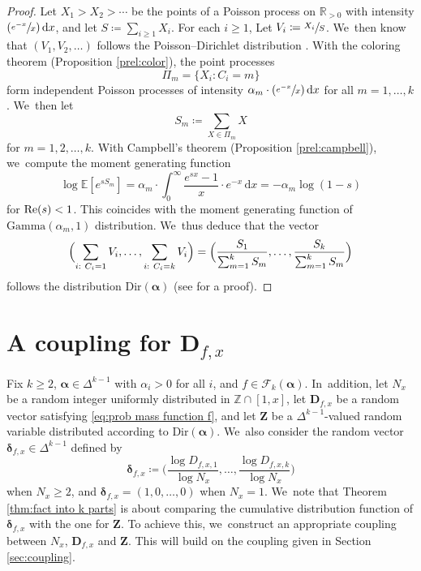 \documentclass[JEP,XML,SOM,Unicode,published]{cedram}
\newcommand{\bD}{{\boldsymbol D}}
\newcommand{\bZ}{{\boldsymbol Z}}
\newcommand{\Psfrac}[2]{(\sfrac{#1}{#2})}
\newcommand{\ZZ}{\mathbb{Z}}
\newcommand{\RR}{\mathbb{R}}
\newcommand{\EE}{\mathbb{E}}
\newcommand{\boldalpha}{\boldsymbol{\alpha}}
\newcommand{\bolddelta}{\boldsymbol{\delta}}
\newcommand{\riemint}[4]{\int_{#1}^{#2}\! #3 \, \mathrm{d}#4}
\renewcommand{\Re}{\textup{Re}}
\newcommand{\simplex}{\Delta^{k-1}}
\newcommand{\bgg}{\Big}
\theoremstyle{plain}
\theoremstyle{definition}
\begin{document}
\begin{proof}
Let $X_1 > X_2 > \cdots$ be the points of a Poisson process on $\RR_{>0}$ with intensity $\Psfrac{e^{-x}}{x} \, \mathrm dx$, and let $S \coloneqq \sum_{i \ge 1} X_i$. For each $i \ge 1$, Let $V_i \coloneqq \sfrac{X_i}{S}$. We~then know that $(V_1, V_2, \ldots)$ follows the Poisson--Dirichlet distribution \cite[Th.\,2.2]{Feng10}. With the coloring theorem (Proposition \ref{prel:color}), the point processes
\[
\Pi_m = \{X_i : C_i = m\}
\]
form independent Poisson processes of intensity $\alpha_m\cdot \Psfrac{e^{-x}}{x} \, \mathrm dx$ for all $m = 1, \ldots, k$. We~then let
\[
S_m \coloneqq \sum_{X \in \Pi_m} X
\]
for $m=1,2,\dots,k$. With Campbell's theorem (Proposition \ref{prel:campbell}), we~compute the moment generating function
\[
\log \EE[e^{sS_m}] = \alpha_m\cdot \riemint{0}{\infty}{\frac{e^{sx}-1}{x}\cdot e^{-x}}{x} = -\alpha_m\log(1-s)
\]
for $\Re(s) < 1$. This coincides with the moment generating function of $\text{Gamma}(\alpha_m, 1)$ distribution. We~thus deduce that the vector
\[
\Bigl(\sum_{i:\ C_i = 1} V_i, \ldots, \sum_{i:\ C_i = k} V_i \Bigr) = \Bigl(\frac{S_1}{\sum_{m=1}^k S_m}, \ldots, \frac{S_k}{\sum_{m=1}^k S_m} \Bigr)
\]
follows the distribution $\text{Dir}(\boldalpha)$ (see \cite[Ch.\,49, pp.\,485-487]{KotzBal00} for a proof).
\end{proof}

\section{A coupling for \texorpdfstring{$\bD_{f, x}$}{bD}}\label{sec:coupling for factorizations}

Fix $k\ge2$, $\boldalpha \in \simplex$ with $\alpha_i>0$ for all $i$, and $f\in\mathcal{F}_k(\boldalpha)$. In~addition, let $N_x$ be a random integer uniformly distributed in $\ZZ \cap [1, x]$, let $\bD_{f, x}$ be a random vector satisfying \eqref{eq:prob mass function f}, and let $\bZ$ be a $\simplex$-valued random variable distributed according to $\text{Dir}(\boldalpha)$. We~also consider the random vector $\bolddelta_{f, x} \in \Delta^{k-1}$ defined by
\begin{equation}
\label{eq:defn delta}
\bolddelta_{f, x} \coloneqq \bgg(\frac{\log D_{f,x,1}}{\log N_x},\dots,\frac{\log D_{f,x,k}}{\log N_x}\bgg)
\end{equation}
when $N_x \ge 2$, and $\bolddelta_{f,x} = (1,0,\ldots,0)$ when $N_x = 1$. We~note that Theorem \ref{thm:fact into k parts} is about comparing the cumulative distribution function of $\bolddelta_{f, x}$ with the one for $\bZ$. To achieve this, we~construct an appropriate coupling between $N_x$, $\bD_{f, x}$ and $\bZ$. This will build on the coupling given in Section \ref{sec:coupling}.
\end{document}

